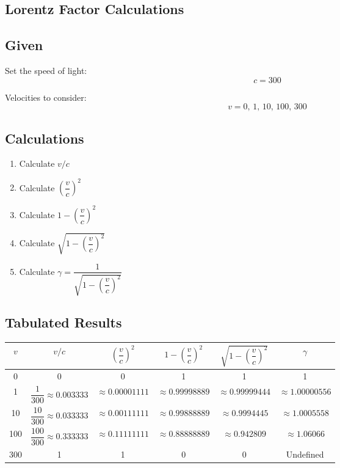 \documentclass{article}
\begin{document}
\begin{multicols}{2}

\section*{Lorentz Factor Calculations}

\subsection*{Given}

Set the speed of light:
\[
c = 300
\]

Velocities to consider:
\[
v = 0,\, 1,\, 10,\, 100,\, 300
\]

\subsection*{Calculations}

\begin{enumerate}
    \item Calculate \( v/c \)
    \item Calculate \( \left( \dfrac{v}{c} \right)^2 \)
    \item Calculate \( 1 - \left( \dfrac{v}{c} \right)^2 \)
    \item Calculate \( \sqrt{1 - \left( \dfrac{v}{c} \right)^2} \)
    \item Calculate \( \gamma = \dfrac{1}{\sqrt{1 - \left( \dfrac{v}{c} \right)^2}} \)
\end{enumerate}

\subsection*{Tabulated Results}

\begin{center}
\begin{tabular}{|c|c|c|c|c|c|}
\hline
\( v \) & \( v/c \) & \( \left( \dfrac{v}{c} \right)^2 \) & \( 1 - \left( \dfrac{v}{c} \right)^2 \) & \( \sqrt{1 - \left( \dfrac{v}{c} \right)^2} \) & \( \gamma \) \\
\hline
0 & 0 & 0 & 1 & 1 & 1 \\
\hline
1 & \( \dfrac{1}{300} \approx 0.003333 \) & \( \approx 0.00001111 \) & \( \approx 0.99998889 \) & \( \approx 0.99999444 \) & \( \approx 1.00000556 \) \\
\hline
10 & \( \dfrac{10}{300} \approx 0.033333 \) & \( \approx 0.00111111 \) & \( \approx 0.99888889 \) & \( \approx 0.9994445 \) & \( \approx 1.0005558 \) \\
\hline
100 & \( \dfrac{100}{300} \approx 0.333333 \) & \( \approx 0.11111111 \) & \( \approx 0.88888889 \) & \( \approx 0.942809 \) & \( \approx 1.06066 \) \\
\hline
300 & 1 & 1 & 0 & 0 & Undefined \\
\hline
\end{tabular}
\end{center}


\end{multicols}
\end{document}
